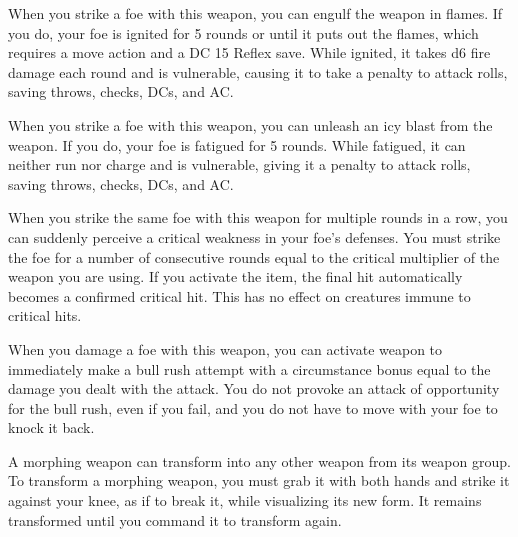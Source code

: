  When you strike a foe with this weapon, you can engulf the weapon in flames. If you do, your foe is ignited for 5 rounds or until it puts out the flames, which requires a move action and a DC 15 Reflex save. While ignited, it takes d6 fire damage each round and is vulnerable, causing it to take a  penalty to attack rolls, saving throws, checks, DCs, and AC.


 When you strike a foe with this weapon, you can unleash an icy blast from the weapon. If you do, your foe is fatigued for 5 rounds. While fatigued, it can neither run nor charge and is vulnerable, giving it a  penalty to attack rolls, saving throws, checks, DCs, and AC.


 When you strike the same foe with this weapon for multiple rounds in a row, you can suddenly perceive a critical weakness in your foe's defenses. You must strike the foe for a number of consecutive rounds equal to the critical multiplier of the weapon you are using. If you activate the item, the final hit automatically becomes a confirmed critical hit. This has no effect on creatures immune to critical hits.


 When you damage a foe with this weapon, you can activate weapon to immediately make a bull rush attempt with a circumstance bonus equal to the damage you dealt with the attack. You do not provoke an attack of opportunity for the bull rush, even if you fail, and you do not have to move with your foe to knock it back.


 A morphing weapon can transform into any other weapon from its weapon group. To transform a morphing weapon, you must grab it with both hands and strike it against your knee, as if to break it, while visualizing its new form. It remains transformed until you command it to transform again.

